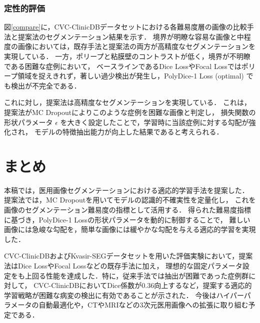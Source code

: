 \documentclass[a4paper,platex,dvipdfmx,twocolumn]{jsarticle}
\begin{document}
\subsubsection{定性的評価}
図\ref{compare}に，CVC-ClinicDBデータセットにおける各難易度層の画像の比較手法と提案法のセグメンテーション結果を示す．
境界が明瞭な容易な画像と中程度の画像においては，既存手法と提案法の両方が高精度なセグメンテーションを実現している．
一方，ポリープと粘膜壁のコントラストが低く，境界が不明瞭である困難な症例において，
ベースラインであるDice LossやFocal Lossではポリープ領域を捉えきれず，著しい過少検出が発生し，PolyDice-1 Loss  (optimal) でも検出が不完全である．

これに対し，提案法は高精度なセグメンテーションを実現している．
これは，提案法がMC Dropoutによりこのような症例を困難な画像と判定し，
損失関数の形状パラメータ $\epsilon$ を大きく設定したことで，学習時に当該症例に対する勾配が強化され，
モデルの特徴抽出能力が向上した結果であると考えられる．

\section{まとめ}
本稿では，医用画像セグメンテーションにおける適応的学習手法を提案した．
提案法では，MC Dropoutを用いてモデルの認識的不確実性を定量化し，
これを画像のセグメンテーション難易度の指標として活用する．
得られた難易度指標に基づき，PolyDice-1 Lossの形状パラメータを動的に制御することで，
難しい画像には急峻な勾配を，簡単な画像には緩やかな勾配を与える適応的学習を実現した．

CVC-ClinicDBおよびKvasir-SEGデータセットを用いた評価実験において，提案法はDice LossやFocal Lossなどの既存手法に加え，
理想的な固定パラメータ設定をも上回る性能を達成した．特に，従来手法では抽出が困難であった症例群に対して，
CVC-ClinicDBにおいてDice係数が$0.36$向上するなど，提案する適応的学習戦略が困難な病変の検出に有効であることが示された．
今後はハイパーパラメータの自動最適化や，CTやMRIなどの3次元医用画像への拡張に取り組む予定である．




\end{document}
